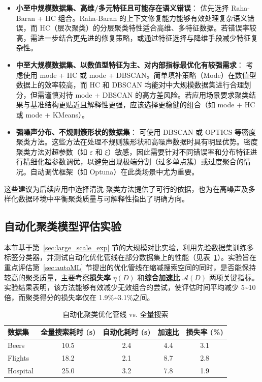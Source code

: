 \documentclass[10pt]{article} %
\numberwithin{equation}{section}
\begin{document}
\begin{itemize}
    \item \textbf{小至中规模数据集、高维/多元特征且可能存在语义错误}：
    优先选择 Raha-Baran + HC 组合。Raha-Baran 的上下文修复能力能够有效处理复杂语义错误，而 HC（层次聚类）的分层聚类特性适合高维、多特征数据。若错误率较高，需进一步结合更先进的修复策略，或通过特征选择与降维手段减少特征复杂性。

    \item \textbf{中至大规模数据集、以数值型特征为主、对内部指标最优化有较强需求}：
    考虑使用 mode + HC 或 mode + DBSCAN。简单填补策略（Mode）在数值型数据上的效率较高，而 HC 和 DBSCAN 均能对中大规模数据集进行合理划分，但需谨慎对待 mode + DBSCAN 的高方差风险。若应用场景要求聚类结果与基准结构更贴近且解释性更强，应该选择更稳健的组合（如 mode + HC 或 mode + KMeans）。

    \item \textbf{强噪声分布、不规则簇形状的数据集}：
    可使用 DBSCAN 或 OPTICS 等密度聚类方法。这些方法在处理不规则簇形状和高噪声数据时具有明显优势。密度聚类方法对超参数（如 $\varepsilon$ 和 $\xi$）敏感，因此需要针对不同错误率和分布特征进行精细化超参数调优，以避免出现极端分割（过多单点簇）或过度聚合的情况。自动调优框架（如 Optuna）在此类场景中尤为重要。
\end{itemize}

这些建议为后续应用中选择清洗-聚类方法提供了可行的依据，也为在高噪声及多样化数据环境中平衡聚类质量与可解释性指出了明确方向。

\subsection{自动化聚类模型评估实验}
\label{sec:automl_exp}
本节基于第~\ref{sec:large_scale_exp} 节的大规模对比实验，利用先验数据集训练多标签分类器，并测试自动化优化管线在部分数据集上的性能（见表~\ref{tab:autoML_res}）。实验旨在重点评估第~\ref{sec:autoML} 节提出的优化管线在缩减搜索空间的同时，是否能保持较高的聚类质量，主要考察\textbf{损失率} \(\eta(D)\) 和\textbf{综合加速比} \(\mathcal{A}(D)\) 两项关键指标。实验结果表明，该方法能够有效减少无效组合的尝试，使评估时间平均减少 5\textasciitilde10 倍，而聚类得分的损失率仅在 1.9\%\textasciitilde3.1\%之间。

\begin{table}[htbp]
\centering
\begin{tabular}{lcccc}
\toprule
\textbf{数据集} & \textbf{全量搜索耗时 (s)} & \textbf{自动化耗时 (s)} & \textbf{加速比} & \textbf{损失率 (\%)} \\
\midrule
Beers & 10.5 & 2.4 & 4.4 & 3.1 \\
Flights & 18.2 & 2.1 & 8.7 & 2.8 \\
Hospital & 25.0 & 3.2 & 7.8 & 1.9 \\
\bottomrule
\end{tabular}
\caption{自动化聚类优化管线 vs. 全量搜索}
\label{tab:autoML_res}
\end{table}
\end{document}
